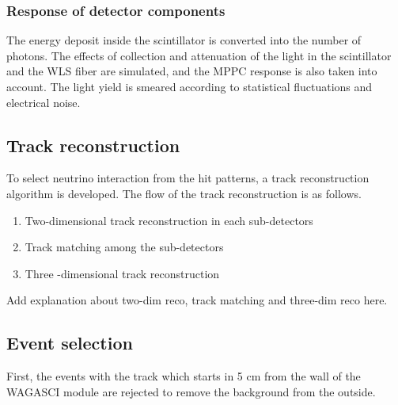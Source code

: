 \subsubsection{Response of detector components}
The energy deposit inside the scintillator is converted into the number of photons. 
The effects of collection and attenuation of the light in the scintillator and the WLS fiber are simulated, and the MPPC response is also taken into account. 
The light yield is smeared according to statistical fluctuations and electrical noise.


\subsection{Track reconstruction}
To select neutrino interaction from the hit patterns, a track reconstruction algorithm is developed.
The flow of the track reconstruction is as follows.
\begin{enumerate}
\item Two-dimensional track reconstruction in each sub-detectors
\item Track matching among the sub-detectors
\item Three -dimensional track reconstruction
\end{enumerate}

Add explanation about two-dim reco, track matching and three-dim reco here.


\subsection{Event selection}

First, the events with the track which starts in 5 cm from the wall of the WAGASCI module are rejected to remove the background from the outside.



